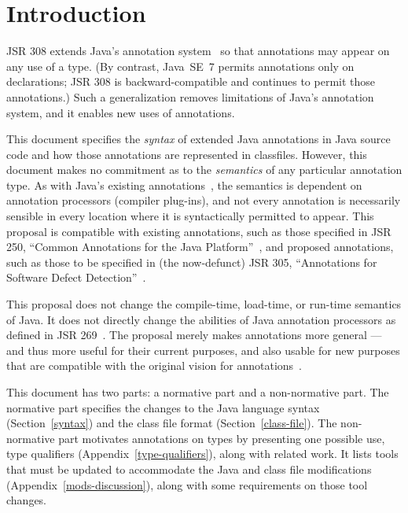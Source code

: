 \documentclass[10pt]{article}
\begin{document}


\tableofcontents

\section{Introduction\label{intro}}

JSR 308 extends Java's annotation system~\cite{JSR175} so that
annotations may appear on any use of a type.
(By contrast, Java~SE~7 permits annotations only on
declarations; JSR 308 is
backward-compatible and continues to permit those annotations.)
Such a generalization removes
limitations of Java's annotation
system, and it enables new uses of annotations.

This document specifies the \emph{syntax} of extended Java annotations in
Java source code and how those annotations are represented in classfiles.
However, this document makes no commitment as to the \emph{semantics} of any
particular annotation type.  As with Java's
existing annotations~\cite{JSR175}, the semantics is dependent on annotation processors
(compiler plug-ins), and not every annotation is necessarily sensible in
every location where it is syntactically permitted to appear.
This proposal is compatible with existing annotations,
such as those specified in JSR 250, ``Common Annotations for the Java
Platform''~\cite{JSR250}, and proposed annotations, such as those to be
specified in (the now-defunct) JSR 305, ``Annotations for Software Defect
Detection''~\cite{JSR305}.

This proposal does not change the compile-time, load-time, or run-time
semantics of Java.  It does not directly change the abilities of Java annotation
processors as defined in JSR 269~\cite{JSR269}.
The proposal merely makes annotations more general --- and thus more useful
for their current purposes, and also usable for new purposes that are
compatible with the original vision for annotations~\cite{JSR175}.

This document has two parts:  a 
normative part and a 
non-normative part.
The normative part specifies the changes to
the Java language syntax (Section~\ref{syntax}) and
the class file format (Section~\ref{class-file}).
%
The non-normative part
motivates annotations on types by presenting one
possible use, type qualifiers
(Appendix~\ref{type-qualifiers}), along with related work.
It lists tools that
must be updated to accommodate the Java and class file
modifications (Appendix~\ref{mods-discussion}), along with some
requirements on those tool changes.
\end{document}
